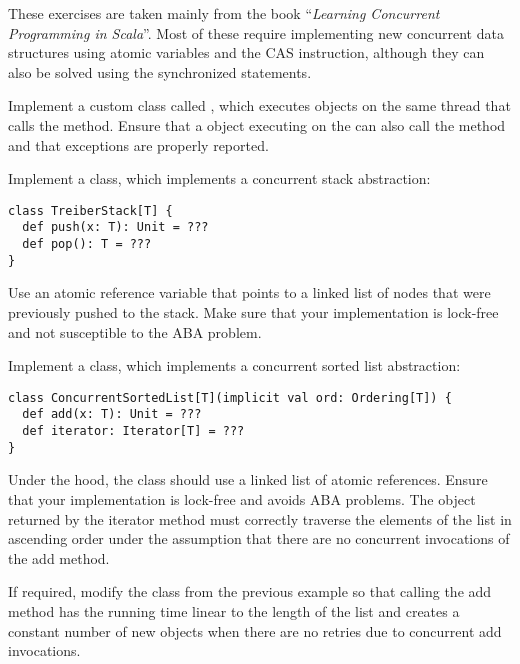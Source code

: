 \documentclass[11pt]{article}
\begin{document}
\myHeader

These exercises are taken mainly from the book ``\emph{Learning Concurrent Programming in Scala}''.
%
Most of these require implementing new concurrent data structures using atomic variables and the CAS instruction, although they can also be solved using the synchronized statements.


\begin{myExercise}
Implement a custom  class called , which executes  objects on the same thread that calls the  method. Ensure that a  object executing on the  can also call the  method and that exceptions are properly reported.
\end{myExercise}

\begin{myExercise}
Implement a  class, which implements a concurrent stack abstraction:
\begin{lstlisting}
class TreiberStack[T] {
  def push(x: T): Unit = ???
  def pop(): T = ???
}
\end{lstlisting}
Use an atomic reference variable that points to a linked list of nodes that were previously pushed to the stack. Make sure that your implementation is lock-free and not susceptible to the ABA problem.
\end{myExercise}

\begin{myExercise}
Implement a  class, which implements a concurrent sorted list abstraction:
\begin{lstlisting}
class ConcurrentSortedList[T](implicit val ord: Ordering[T]) {
  def add(x: T): Unit = ???
  def iterator: Iterator[T] = ???
}
\end{lstlisting}
Under the hood, the  class should use a linked list of atomic references. Ensure that your implementation is lock-free and avoids ABA problems.
The  object returned by the iterator method must correctly traverse the elements of the list in ascending order under the assumption that there are no concurrent invocations of the add method.
\end{myExercise}

\begin{myExercise}
If required, modify the  class from the previous example so that calling the add method has the running time linear to the length of the list and creates a constant number of new objects when there are no retries due to concurrent add invocations.
\end{myExercise}
  
\end{document}
